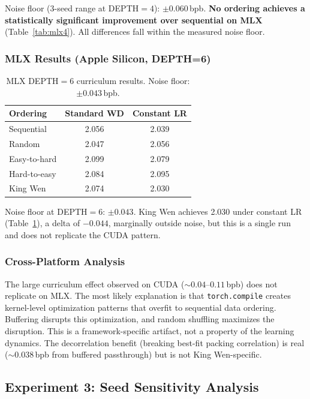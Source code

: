 \documentclass{article}
\begin{document}
Noise floor (3-seed range at DEPTH${}=4$): $\pm 0.060$\,bpb. \textbf{No ordering achieves a statistically significant improvement over sequential on MLX} (Table~\ref{tab:mlx4}). All differences fall within the measured noise floor.

\subsubsection{MLX Results (Apple Silicon, DEPTH=6)}

\begin{table}[h]
\centering
\begin{tabular}{lcc}
\toprule
\textbf{Ordering} & \textbf{Standard WD} & \textbf{Constant LR} \\
\midrule
Sequential & 2.056 & 2.039 \\
Random & 2.047 & 2.056 \\
Easy-to-hard & 2.099 & 2.079 \\
Hard-to-easy & 2.084 & 2.095 \\
King Wen & 2.074 & 2.030 \\
\bottomrule
\end{tabular}
\caption{MLX DEPTH${}=6$ curriculum results. Noise floor: $\pm 0.043$\,bpb.}
\label{tab:mlx6}
\end{table}

Noise floor at DEPTH${}=6$: $\pm 0.043$. King Wen achieves 2.030 under constant LR (Table~\ref{tab:mlx6}), a delta of $-0.044$, marginally outside noise, but this is a single run and does not replicate the CUDA pattern.

\subsubsection{Cross-Platform Analysis}

The large curriculum effect observed on CUDA (${\sim}0.04$--$0.11$\,bpb) does not replicate on MLX. The most likely explanation is that \texttt{torch.compile} creates kernel-level optimization patterns that overfit to sequential data ordering. Buffering disrupts this optimization, and random shuffling maximizes the disruption. This is a framework-specific artifact, not a property of the learning dynamics. The decorrelation benefit (breaking best-fit packing correlation) is real (${\sim}0.038$\,bpb from buffered passthrough) but is not King Wen-specific.

\subsection{Experiment 3: Seed Sensitivity Analysis}\label{sec:seeds}
\end{document}
